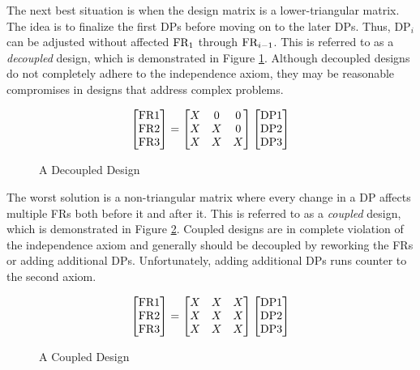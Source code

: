 The next best situation is when the design matrix is a lower-triangular matrix.  The idea is to finalize the first
DPs before moving on to the later DPs.  Thus, \(\text{DP}_i\) can be adjusted without affected \(\text{FR}_1\) through
\(\text{FR}_{i-1}\).  This is referred to as a \emph{decoupled} design, which is demonstrated in Figure
\ref{fig:decoupled}.  Although decoupled designs do not completely adhere to the independence axiom, they may be
reasonable compromises in designs that address complex problems.

\begin{figure}[h]
  \label{fig:decoupled}
  \begin{equation*}
    \begin{bmatrix}
      \text{FR}1 \\ \text{FR}2 \\ \text{FR}3
    \end{bmatrix}=\begin{bmatrix}
    X & 0 & 0 \\
    X & X & 0 \\
    X & X & X \\
    \end{bmatrix}\begin{bmatrix}
      \text{DP}1 \\ \text{DP}2 \\ \text{DP}3
    \end{bmatrix}
  \end{equation*}
  \caption{A Decoupled Design}
\end{figure}

The worst solution is a non-triangular matrix where every change in a DP affects multiple FRs both before it and
after it.  This is referred to as a \emph{coupled} design, which is demonstrated in Figure \ref{fig:coupled}.
Coupled designs are in complete violation of the independence axiom and generally should be decoupled by reworking
the FRs or adding additional DPs.  Unfortunately, adding additional DPs runs counter to the second axiom.

\begin{figure}[h]
  \label{fig:coupled}
  \begin{equation*}
    \begin{bmatrix}
      \text{FR}1 \\ \text{FR}2 \\ \text{FR}3
    \end{bmatrix}=\begin{bmatrix}
    X & X & X \\
    X & X & X \\
    X & X & X \\
    \end{bmatrix}\begin{bmatrix}
      \text{DP}1 \\ \text{DP}2 \\ \text{DP}3
    \end{bmatrix}
  \end{equation*}
  \caption{A Coupled Design}
\end{figure}

